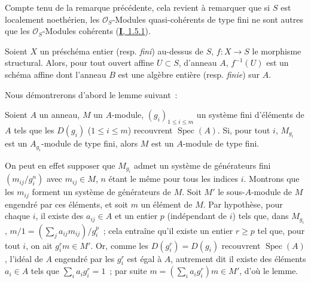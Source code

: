 Compte tenu de la remarque précédente, cela revient à remarquer que si $S$ est
localement noethérien, les $\mathcal{O}_S$-Modules quasi-cohérents de type fini
ne sont autres que les $\mathcal{O}_S$-Modules cohérents
(\hyperref[I.1.5.1-fr]{\textbf{I}, 1.5.1}).

\begin{proposition}[6.1.4]
\label{II.6.1.4-fr}
Soient $X$ un préschéma entier \textup{(resp. \emph{fini})} au-dessus de $S$, $f:X\to S$ le
morphisme structural. Alors, pour tout ouvert affine $U\subset S$, d'anneau
$A$, $f^{-1}(U)$ est un schéma affine dont l'anneau $B$ est une algèbre
entière \textup{(resp. \emph{finie})} sur $A$.
\end{proposition}


Nous démontrerons d'abord le lemme suivant~:

\begin{lemma}[6.1.4.1]
\label{II.6.1.4.1-fr}
Soient $A$ un anneau, $M$ un $A$-module, $(g_i)_{1\leq i\leq m}$ un système
fini d'éléments de $A$ tels que les $D(g_i)$ ($1\leq i\leq m$) recouvrent
$\operatorname{Spec}(A)$. Si, pour tout $i$, $M_{g_i}$ est un
$A_{g_i}$-module de type fini, alors $M$ est un $A$-module de type fini.
\end{lemma}

On peut en effet supposer que $M_{g_i}$ admet un système de générateurs fini
$(m_{ij}/g_i^n)$ avec $m_{ij}\in M$, $n$ étant le même pour tous les indices
$i$. Montrons que les $m_{ij}$ forment un système de générateurs de $M$. Soit
$M'$ le sous-$A$-module de $M$ engendré par ces éléments, et soit $m$ un
élément de $M$. Par hypothèse, pour chaque $i$, il existe des $a_{ij}\in A$ et
un entier $p$ (indépendant de $i$) tels que, dans $M_{g_i}$,
$m/1=(\sum_j a_{ij}m_{ij})/g_i^p$~; cela entraîne qu'il existe un entier
$r\geq p$ tel que, pour tout $i$, on ait $g_i^r m\in M'$. Or, comme les
$D(g_i^r)=D(g_i)$ recouvrent $\operatorname{Spec}(A)$, l'idéal de $A$
engendré par les $g_i^r$ est égal à $A$, autrement dit il existe des éléments
$a_i\in A$ tels que $\sum_i a_i g_i^r=1$~; par suite
$m=(\sum_i a_i g_i^r)m\in M'$, d'où le lemme.

